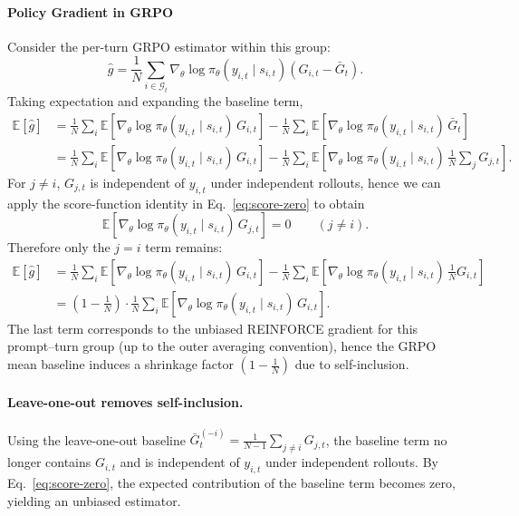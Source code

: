 \paragraph{Policy Gradient in GRPO}
Consider the per-turn GRPO estimator within this group:
\begin{equation}
\hat g
=\frac{1}{N}\sum_{i\in\mathcal{G}_{t}}
\nabla_\theta \log \pi_\theta(y_{i,t}\mid s_{i,t})
\left(G_{i,t}-\bar G_{t}\right).
\label{eq:app:grpo-grad}
\end{equation}
Taking expectation and expanding the baseline term,
\begin{align}
\mathbb{E}[\hat g]
&=\frac{1}{N}\sum_{i}\mathbb{E}\!\left[
\nabla_\theta \log \pi_\theta(y_{i,t}\mid s_{i,t})\,G_{i,t}
\right]
-\frac{1}{N}\sum_{i}\mathbb{E}\!\left[
\nabla_\theta \log \pi_\theta(y_{i,t}\mid s_{i,t})\,\bar G_{t}
\right] \nonumber\\
&=\frac{1}{N}\sum_{i}\mathbb{E}\!\left[
\nabla_\theta \log \pi_\theta(y_{i,t}\mid s_{i,t})\,G_{i,t}
\right]
-\frac{1}{N}\sum_{i}\mathbb{E}\!\left[
\nabla_\theta \log \pi_\theta(y_{i,t}\mid s_{i,t})\,
\frac{1}{N}\sum_{j}G_{j,t}
\right].
\label{eq:app:expand}
\end{align}
For $j\neq i$, $G_{j,t}$ is independent of $y_{i,t}$ under independent rollouts, hence we can apply the score-function identity in Eq.~\eqref{eq:score-zero} to obtain
\[
\mathbb{E}\!\left[
\nabla_\theta \log \pi_\theta(y_{i,t}\mid s_{i,t})\,G_{j,t}
\right]=0\qquad (j\neq i).
\]
Therefore only the $j=i$ term remains:
\begin{align}
\mathbb{E}[\hat g]
&=\frac{1}{N}\sum_{i}\mathbb{E}\!\left[
\nabla_\theta \log \pi_\theta(y_{i,t}\mid s_{i,t})\,G_{i,t}
\right]
-\frac{1}{N}\sum_{i}\mathbb{E}\!\left[
\nabla_\theta \log \pi_\theta(y_{i,t}\mid s_{i,t})\,\frac{1}{N}G_{i,t}
\right] \nonumber\\
&=\left(1-\frac{1}{N}\right)\cdot
\frac{1}{N}\sum_{i}\mathbb{E}\!\left[
\nabla_\theta \log \pi_\theta(y_{i,t}\mid s_{i,t})\,G_{i,t}
\right].
\label{eq:app:scaled}
\end{align}
The last term corresponds to the unbiased REINFORCE gradient for this prompt--turn group (up to the outer averaging convention), hence the GRPO mean baseline induces a shrinkage factor $(1-\frac{1}{N})$ due to self-inclusion.

\paragraph{Leave-one-out removes self-inclusion.}
Using the leave-one-out baseline
$\bar G^{(-i)}_{t}=\frac{1}{N-1}\sum_{j\neq i}G_{j,t}$,
the baseline term no longer contains $G_{i,t}$ and is independent of $y_{i,t}$ under independent rollouts. By Eq.~\eqref{eq:score-zero}, the expected contribution of the baseline term becomes zero, yielding an unbiased estimator.
